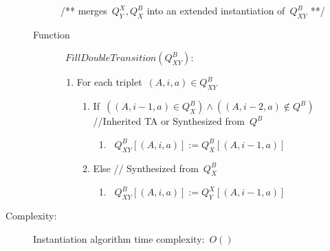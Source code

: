 \begin{description}
\begin{description}
\begin{enumerate}
\begin{enumerate}
\begin{enumerate}
                    \end{enumerate}
            \end{enumerate}
    \end{enumerate}
    /{*}{*}
    merges~$Q^{X}_{Y},Q^B_{X}$ into an extended instantiation of~$Q_{XY}^B$
    {*}{*}/
    \item [Function]~$FillDoubleTransition(Q_{XY}^B)$:
    \begin{enumerate}
      \item For each triplet~$(A,i,a)∈Q_{XY}^B$
            \begin{enumerate}
              \item If~$((A,i-1,a)∈Q^B_{X})∧((A,i-2,a)\notin Q^B)$ //Inherited TA or Synthesized from~$Q^B$
                    \begin{enumerate}
                      \item~$Q_{XY}^B[(A,i,a)]:=Q_{X}^B[(A,i-1,a)]$
                    \end{enumerate}
              \item Else // Synthesized from~$Q_{X}^B$
                    \begin{enumerate}
                      \item~$Q_{XY}^B[(A,i,a)]:=Q^{X}_{Y}[(A,i-1,a)]$
                    \end{enumerate}
            \end{enumerate}
    \end{enumerate}
  \end{description}
  \item [Complexity:]
  Instantiation algorithm time complexity:~$O()$
\end{description}
